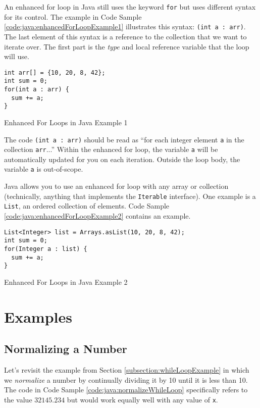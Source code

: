 An enhanced for loop in Java still uses the keyword \texttt{for} 
but uses different syntax for its control.  The example in Code Sample 
\ref{code:java:enhancedForLoopExample1} illustrates this syntax:
\texttt{(int a : arr)}.  The last element of this syntax is
a reference to the collection that we want to iterate over.  The first
part is the \emph{type} and local reference variable that the loop
will use.  

\begin{listing}[!h]
\begin{verbatim}
int arr[] = {10, 20, 8, 42};
int sum = 0;
for(int a : arr) {
  sum += a;
}
\end{verbatim}
  \caption{Enhanced For Loops in Java Example 1}
  \label{code:java:enhancedForLoopExample1}
\end{listing}

The code \texttt{(int a : arr)} should be read as ``for each
integer element \texttt{a} in the collection \texttt{arr}...''
Within the enhanced for loop, the variable \texttt{a} will
be automatically updated for you on each iteration.  Outside the
loop body, the variable \texttt{a} is out-of-scope.  

Java allows you to use an enhanced for loop with any array or collection
(technically, anything that implements the \texttt{Iterable} 
interface).  One example is a \texttt{List}, an ordered
collection of elements.  Code Sample \ref{code:java:enhancedForLoopExample2} 
contains an example.

\begin{listing}[!h]
\begin{verbatim}
List<Integer> list = Arrays.asList(10, 20, 8, 42);
int sum = 0;
for(Integer a : list) {
  sum += a;
}
\end{verbatim}
  \caption{Enhanced For Loops in Java Example 2}
  \label{code:java:enhancedForLoopExample2}
\end{listing}

\section{Examples}

\subsection{Normalizing a Number}

Let's revisit the example from Section \ref{subsection:whileLoopExample} in which 
we \emph{normalize} a number by continually dividing it by 10 until it is less 
than 10.  The code in Code Sample \ref{code:java:normalizeWhileLoop} specifically
refers to the value $32145.234$ but would work equally well with any value of 
\texttt{x}.

